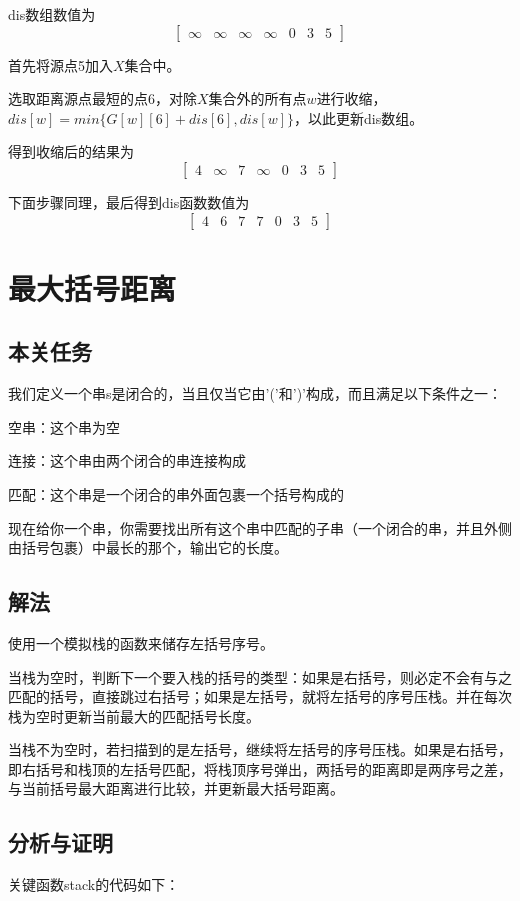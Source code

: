 \documentclass[UTF8,a4paperdui, %
]{ctexart}
\begin{document}
dis数组数值为
\[
\left[
	\begin{array}{ccccccc}
		\infty & \infty & \infty & \infty & 0 & 3 & 5
	\end{array}
\right]
\]

首先将源点5加入$X$集合中。

选取距离源点最短的点6，对除$X$集合外的所有点$w$进行收缩，$dis[w]=min\{G[w][6]+dis[6],dis[w]\}$，以此更新dis数组。

得到收缩后的结果为
\[
\left[
	\begin{array}{ccccccc}
		4 & \infty & 7 & \infty & 0 & 3 & 5
	\end{array}
\right]
\]

下面步骤同理，最后得到dis函数数值为
\[
\left[
	\begin{array}{ccccccc}
		4 & 6 & 7 & 7 & 0 & 3 & 5
	\end{array}
\right]
\]
\section{最大括号距离}
\subsection{本关任务}
我们定义一个串s是闭合的，当且仅当它由'('和')'构成，而且满足以下条件之一：

空串：这个串为空

连接：这个串由两个闭合的串连接构成

匹配：这个串是一个闭合的串外面包裹一个括号构成的

现在给你一个串，你需要找出所有这个串中匹配的子串（一个闭合的串，并且外侧由括号包裹）中最长的那个，输出它的长度。
\subsection{解法}
使用一个模拟栈的函数来储存左括号序号。

当栈为空时，判断下一个要入栈的括号的类型：如果是右括号，则必定不会有与之匹配的括号，直接跳过右括号；如果是左括号，就将左括号的序号压栈。并在每次栈为空时更新当前最大的匹配括号长度。

当栈不为空时，若扫描到的是左括号，继续将左括号的序号压栈。如果是右括号，即右括号和栈顶的左括号匹配，将栈顶序号弹出，两括号的距离即是两序号之差，与当前括号最大距离进行比较，并更新最大括号距离。


\subsection{分析与证明}
关键函数stack的代码如下：
\end{document}
